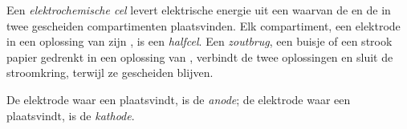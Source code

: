 \begin{definition}\label{def:g12:cells-and-electrolysis:cell}
Een \emph{elektrochemische cel} levert
elektrische energie uit een  waarvan de  en de
 in twee gescheiden compartimenten plaatsvinden. Elk compartiment,
een  elektrode in een oplossing van zijn , is een
\emph{halfcel}. Een \emph{zoutbrug},
een buisje of een strook papier gedrenkt in een oplossing van ,
verbindt de twee oplossingen en sluit de stroomkring, terwijl ze
gescheiden blijven.
\end{definition}

\begin{definition}\label{def:g12:cells-and-electrolysis:anode}
De elektrode waar een  plaatsvindt, is de
\emph{anode}; de elektrode waar een  plaatsvindt, is
de \emph{kathode}.
\end{definition}

